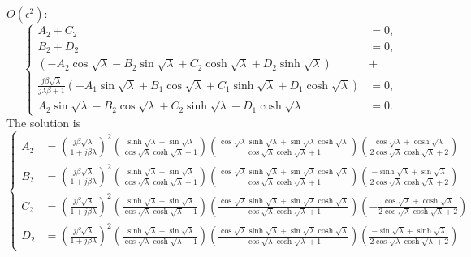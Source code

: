 \documentclass{article}
\begin{document}
\noindent
$O(\epsilon^2)$:
\begin{equation}
    \left\{\begin{aligned}
        A_2 + C_2 &= 0, \\
        B_2 + D_2 &= 0, \\
        \left( - A_2 \cos{\sqrt{\lambda}} - B_2 \sin{\sqrt{\lambda}} + C_2 \cosh{\sqrt{\lambda}} + D_2 \sinh{\sqrt{\lambda}} \right) &+ \\
        \frac{j \beta \sqrt{\lambda}}{ j\lambda \beta + 1 } \left( - A_1 \sin{\sqrt{\lambda}} + B_1 \cos{\sqrt{\lambda}} + C_1 \sinh{\sqrt{\lambda}} + D_1 \cosh{\sqrt{\lambda}} \right) &= 0, \\
        A_2 \sin{\sqrt{\lambda}} - B_2 \cos{\sqrt{\lambda}} + C_2 \sinh{\sqrt{\lambda}} + D_1 \cosh{\sqrt{\lambda}} &= 0.
    \end{aligned}\right.
\end{equation}
The solution is
\scriptsize
\begin{equation}
    \left\{\begin{aligned}
        A_2 &= \left( \frac{j \beta \sqrt{\lambda }}{1+j \beta \lambda } \right)^2 \left(\frac{ \sinh\sqrt{\lambda } - \sin\sqrt{\lambda }}{\cos\sqrt{\lambda } \cosh\sqrt{\lambda }+1} \right) \left( \frac{\cos\sqrt{\lambda } \sinh\sqrt{\lambda }+\sin\sqrt{\lambda } \cosh\sqrt{\lambda }}{\cos\sqrt{\lambda } \cosh\sqrt{\lambda }+1} \right) \left(\frac{\cos\sqrt{\lambda }+\cosh\sqrt{\lambda }}{2 \cos\sqrt{\lambda }\cosh\sqrt{\lambda }+2} \right) \\
        B_2 &= \left( \frac{j \beta \sqrt{\lambda }}{1+j \beta \lambda } \right)^2 \left(\frac{\sinh\sqrt{\lambda } - \sin\sqrt{\lambda }}{\cos\sqrt{\lambda } \cosh\sqrt{\lambda }+1} \right) \left( \frac{\cos\sqrt{\lambda } \sinh\sqrt{\lambda }+\sin\sqrt{\lambda } \cosh\sqrt{\lambda }}{\cos\sqrt{\lambda } \cosh\sqrt{\lambda }+1} \right) \left( \frac{-\sinh\sqrt{\lambda }+\sin\sqrt{\lambda }}{2 \cos\sqrt{\lambda }\cosh\sqrt{\lambda }+2} \right)\\
        C_2 &= \left( \frac{j \beta \sqrt{\lambda }}{1+j \beta \lambda } \right)^2 \left(\frac{\sinh\sqrt{\lambda } - \sin\sqrt{\lambda }}{\cos\sqrt{\lambda } \cosh\sqrt{\lambda }+1} \right) \left( \frac{\cos\sqrt{\lambda } \sinh\sqrt{\lambda }+\sin\sqrt{\lambda } \cosh\sqrt{\lambda }}{\cos\sqrt{\lambda } \cosh\sqrt{\lambda }+1} \right) \left( -\frac{\cos\sqrt{\lambda }+\cosh\sqrt{\lambda }}{2 \cos\sqrt{\lambda } \cosh\sqrt{\lambda }+2} \right)\\
        D_2 &= \left( \frac{j \beta \sqrt{\lambda }}{1+j \beta \lambda } \right)^2 \left(\frac{\sinh\sqrt{\lambda } - \sin\sqrt{\lambda }}{\cos\sqrt{\lambda } \cosh\sqrt{\lambda }+1} \right) \left( \frac{\cos\sqrt{\lambda } \sinh\sqrt{\lambda }+\sin\sqrt{\lambda } \cosh\sqrt{\lambda }}{\cos\sqrt{\lambda } \cosh\sqrt{\lambda }+1} \right) \left( \frac{-\sin\sqrt{\lambda }+\sinh\sqrt{\lambda }}{2 \cos\sqrt{\lambda }\cosh\sqrt{\lambda }+2} \right)
    \end{aligned}\right.
\end{equation}
\normalsize
\end{document}
